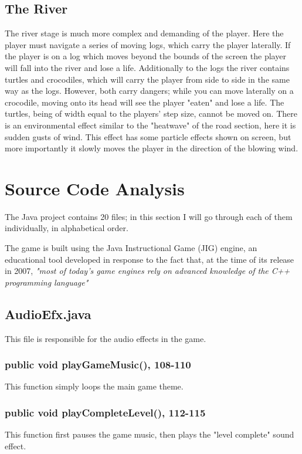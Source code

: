 \documentclass[12pt]{article}
\begin{document}
\subsection{The River}
The river stage is much more complex and demanding of the player.
Here the player must navigate a series of moving logs, which carry the player laterally.
If the player is on a log which moves beyond the bounds of the screen the player will fall into the river and lose a life.
Additionally to the logs the river contains turtles and crocodiles, which will carry the player from side to side in the same way as the logs.
However, both carry dangers; while you can move laterally on a crocodile, moving onto its head will see the player "eaten" and lose a life.
The turtles, being of width equal to the players' step size, cannot be moved on.
There is an environmental effect similar to the "heatwave" of the road section, here it is sudden gusts of wind.
This effect has some particle effects shown on screen, but more importantly it slowly moves the player in the direction of the blowing wind.

\section{Source Code Analysis}

The Java project contains 20 files; in this section I will go through each of them individually, in alphabetical order.

The game is built using the Java Instructional Game (JIG) engine, an educational tool developed in response to the fact that, at the time of its release in 2007, \textit{"most of today’s game engines rely on advanced knowledge of the C++ programming language"}\cite{jig-tutorial}

\subsection{AudioEfx.java}
This file is responsible for the audio effects in the game.

\subsubsection{public void playGameMusic(), 108-110}
This function simply loops the main game theme.

\subsubsection{public void playCompleteLevel(), 112-115}
This function first pauses the game music, then plays the "level complete" sound effect.
\end{document}
